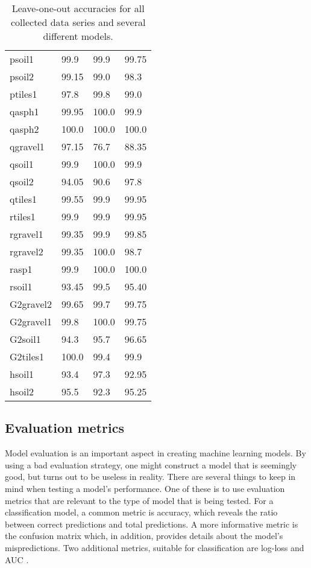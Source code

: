 \begin{table}
\begin{center}
\begin{tabular}{|l|l|l|l|}
psoil1 &99.9 & 99.9&99.75\\
psoil2 &99.15 & 99.0&98.3\\
ptiles1& 97.8 & 99.8&99.0\\
qasph1& 99.95 & \cellcolor{green!20}100.0& 99.9\\
qasph2& \cellcolor{green!20}100.0 & \cellcolor{green!20}100.0& 100.0\\
qgravel1& 97.15 & \cellcolor{red!20} 76.7 & 88.35\\
qsoil1 &99.9 & \cellcolor{green!20}100.0 & 99.9\\
qsoil2& 94.05 & \cellcolor{red!20} 90.6& 97.8\\
qtiles1& 99.55 & 99.9& 99.95\\
rtiles1 &99.9 & 99.9& 99.95\\
rgravel1& 99.35 & 99.9 & 99.85\\
rgravel2 &99.35 & \cellcolor{green!20}100.0 & 98.7\\
rasp1 &99.9 & 100.0 & 100.0\\
rsoil1 &\cellcolor{red!20} 93.45 & 99.5& 95.40\\
G2gravel2& 99.65& 99.7& 99.75\\ 
G2gravel1& 99.8 & \cellcolor{green!20}100.0& 99.75\\
G2soil1 &\cellcolor{red!20} 94.3 & 95.7& 96.65\\
G2tiles1& \cellcolor{green!20}100.0 & 99.4 & 99.9\\
hsoil1 &\cellcolor{red!20} 93.4 &97.3 & 92.95\\
hsoil2 &95.5 & \cellcolor{red!20} 92.3 & 95.25\\
\hline
  \end{tabular}
\end{center}
\label{tab:loo}
\caption{Leave-one-out accuracies for all collected data series and several different models.}
\end{table}

\subsection{Evaluation metrics}
Model evaluation is an important aspect in creating machine learning models. By using a bad evaluation strategy, one might construct a model that is seemingly good, but turns out to be useless in reality. There are several things to keep in mind when testing a model's performance. One of these is to use evaluation metrics that are relevant to the type of model that is being tested. For a classification model, a common metric is accuracy, which reveals the ratio between correct predictions and total predictions. A more informative metric is the confusion matrix which, in addition, provides details about the model's mispredictions. Two additional metrics, suitable for classification are log-loss and AUC \citep{zheng_2015}. 

